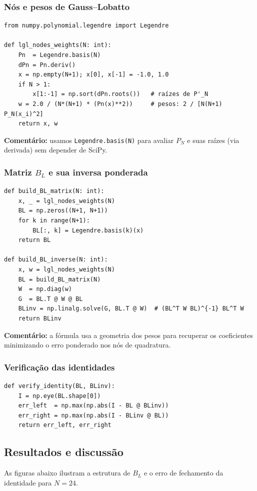 \documentclass[12pt,a4paper]{article}
\begin{document}
\subsubsection*{Nós e pesos de Gauss–Lobatto}
\begin{verbatim}
from numpy.polynomial.legendre import Legendre

def lgl_nodes_weights(N: int):
    Pn  = Legendre.basis(N)
    dPn = Pn.deriv()
    x = np.empty(N+1); x[0], x[-1] = -1.0, 1.0
    if N > 1:
        x[1:-1] = np.sort(dPn.roots())   # raízes de P'_N
    w = 2.0 / (N*(N+1) * (Pn(x)**2))     # pesos: 2 / [N(N+1) P_N(x_i)^2]
    return x, w
\end{verbatim}
\textbf{Comentário:} usamos \texttt{Legendre.basis(N)} para avaliar \(P_N\) e suas raízes (via derivada) sem depender de SciPy.

\subsubsection*{Matriz \(B_L\) e sua inversa ponderada}
\begin{verbatim}
def build_BL_matrix(N: int):
    x, _ = lgl_nodes_weights(N)
    BL = np.zeros((N+1, N+1))
    for k in range(N+1):
        BL[:, k] = Legendre.basis(k)(x)
    return BL

def build_BL_inverse(N: int):
    x, w = lgl_nodes_weights(N)
    BL = build_BL_matrix(N)
    W  = np.diag(w)
    G  = BL.T @ W @ BL
    BLinv = np.linalg.solve(G, BL.T @ W)  # (BL^T W BL)^{-1} BL^T W
    return BLinv
\end{verbatim}
\textbf{Comentário:} a fórmula usa a geometria dos pesos para recuperar os coeficientes minimizando o erro ponderado nos nós de quadratura.

\subsubsection*{Verificação das identidades}
\begin{verbatim}
def verify_identity(BL, BLinv):
    I = np.eye(BL.shape[0])
    err_left  = np.max(np.abs(I - BL @ BLinv))
    err_right = np.max(np.abs(I - BLinv @ BL))
    return err_left, err_right
\end{verbatim}

\subsection{Resultados e discussão}
As figuras abaixo ilustram a estrutura de \(B_L\) e o erro de fechamento da identidade para \(N=24\).
\end{document}
